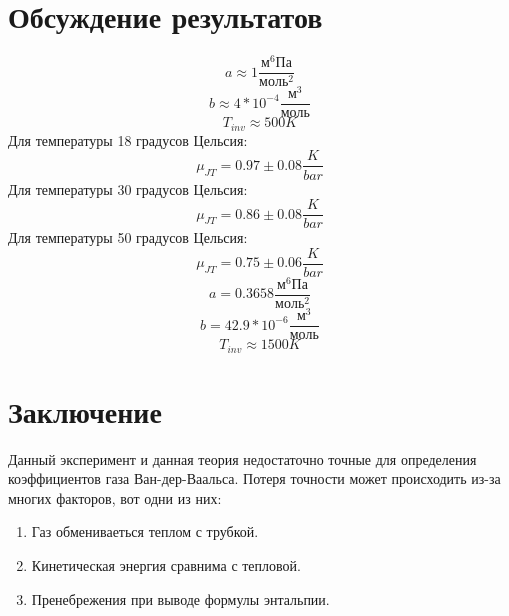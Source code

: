 \documentclass[1 pt]{article}
\begin{document}
\section{Обсуждение результатов}
\begin{equation*}
    a \approx 1 \frac{м^{6}Па}{моль^2}
\end{equation*}
\begin{equation*}
    b \approx 4*10^{-4} \frac{м^3}{моль}
\end{equation*}
\begin{equation*}
    T_{inv}  \approx 500 K
\end{equation*}
Для температуры 18 градусов Цельсия:
\begin{equation*}
    \mu_{JT} = 0.97 \pm 0.08 \frac{K}{bar}
\end{equation*}
Для температуры 30 градусов Цельсия:
\begin{equation*}
    \mu_{JT} = 0.86 \pm 0.08 \frac{K}{bar}
\end{equation*}
Для температуры 50 градусов Цельсия:
\begin{equation*}
    \mu_{JT} = 0.75 \pm 0.06 \frac{K}{bar}
\end{equation*}
\begin{equation*}
    a = 0.3658 \frac{м^{6}Па}{моль^2}
\end{equation*}
\begin{equation*}
    b = 42.9*10^{-6} \frac{м^3}{моль}
\end{equation*}
\begin{equation*}
    T_{inv} \approx 1500 K
\end{equation*}
\section{Заключение}
Данный эксперимент и данная теория недостаточно точные для определения коэффициентов газа Ван-дер-Ваальса. Потеря точности может происходить из-за многих факторов, вот одни из них:
\begin{enumerate} 
  \item Газ обмениваеться теплом с трубкой.
  \item Кинетическая энергия сравнима с тепловой.
  \item Пренебрежения при выводе формулы энтальпии.
\end{enumerate}
\newpage
\tableofcontents
\end{document}

